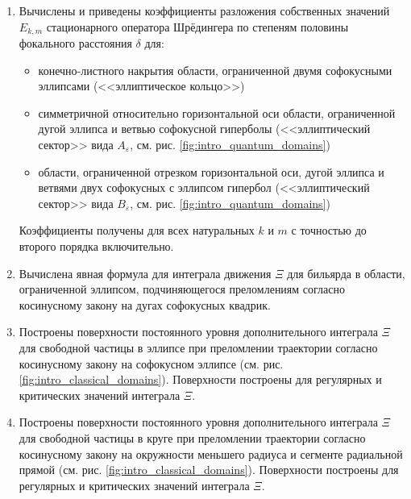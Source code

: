 {}
\begin{enumerate}[beginpenalty=10000] %
  \item Вычислены и приведены коэффициенты разложения собственных значений $E_{k,m}$ стационарного оператора Шрёдингера по степеням половины фокального расстояния $\delta$ для:
   \begin{itemize}[beginpenalty=10000] %
  \item конечно-листного накрытия области, ограниченной двумя софокусными эллипсами (<<эллиптическое кольцо>>) 
  \item симметричной относительно горизонтальной оси области, ограниченной дугой эллипса и ветвью софокусной  гиперболы (<<эллиптический сектор>> вида $A_\varepsilon$, см. рис. \ref{fig:intro_quantum_domains})
  \item области, ограниченной отрезком горизонтальной оси, дугой эллипса и ветвями двух софокусных с эллипсом гипербол (<<эллиптический сектор>> вида $B_\varepsilon$, см. рис. \ref{fig:intro_quantum_domains})
  \end{itemize}
  Коэффициенты получены для всех натуральных $k$ и $m$ с точностью до второго порядка включительно.

  \item Вычислена явная формула для интеграла движения $\Xi$ для бильярда в области, ограниченной эллипсом, подчиняющегося преломлениям согласно косинусному закону на дугах софокусных квадрик.
  \item Построены поверхности постоянного уровня дополнительного интеграла $\Xi$ для свободной частицы в эллипсе при преломлении траектории согласно косинусному закону на софокусном эллипсе (см. рис. \ref{fig:intro_classical_domains}). Поверхности построены для регулярных и критических значений интеграла $\Xi$.
   \item Построены поверхности постоянного уровня дополнительного интеграла $\Xi$ для свободной частицы в круге при преломлении траектории согласно косинусному закону на окружности меньшего радиуса и сегменте радиальной прямой (см. рис. \ref{fig:intro_classical_domains}). Поверхности построены для регулярных и критических значений интеграла $\Xi$.
\end{enumerate}



